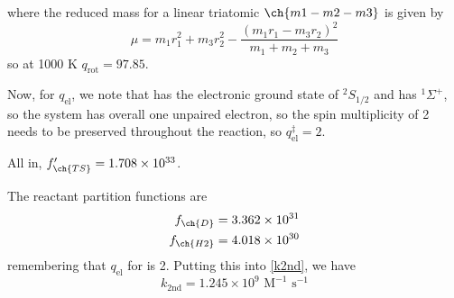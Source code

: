 where the reduced mass for a linear triatomic $\ch{m1 - m2 - m3}$ is given by
\begin{equation}
  \mu=m_1r_1^2+m_3r_2^2-\frac{(m_1r_1-m_3r_2)^2}{m_1+m_2+m_3}
\end{equation}
so at 1000 K $q_{\text{rot}}=97.85$.\par 
Now, for $q_{\text{el}}$, we note that  has the electronic ground state of $^2S_{1/2}$ and  has $^1\Sigma^+$, so the system has overall one unpaired electron, so the spin multiplicity of 2 needs to be preserved throughout the reaction, so $q^{\ddag}_{\text{el}}=2$.\par
All in, $f'_{\ch{TS}}=1.708\times10^{33}$.\par
The reactant partition functions are
\begin{equation}
\begin{aligned}
  f_{\ch{D}}&=3.362\times10^{31}\\
  f_{\ch{H2}}&=4.018\times10^{30}
\end{aligned}
\end{equation}
remembering that $q_{\text{el}}$ for  is 2. Putting this into \cref{k2nd}, we have
\begin{equation}
  k_{\text{2nd}}=1.245\times10^9\text{ M}^{-1}\text{ s}^{-1}
\end{equation}

